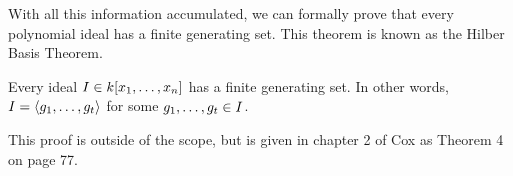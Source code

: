 With all this information accumulated, we can formally prove that every polynomial ideal has a finite generating set. This theorem is known as the Hilber Basis Theorem.

\begin{theorem}
   Every ideal $I \in k\lbrack x_1, \dots, x_n \rbrack $ has a finite generating set. In other words, $ I = \langle g_1, \dots, g_t \rangle$ for some $g_1, \dots, g_t \in I$.
\end{theorem}

This proof is outside of the scope, but is given in chapter 2 of Cox \cite{Theory} as Theorem 4 on page 77. 